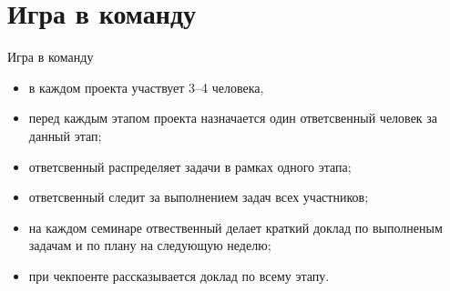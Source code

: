 \documentclass[10pt,pdf,hyperref={unicode}]{beamer}
\begin{document}
\section{Игра в команду}
\begin{frame}{Игра в команду}
\bigskip

\begin{itemize}
    \item в каждом проекта участвует 3--4 человека,
    \item перед каждым этапом проекта назначается один ответсвенный человек за данный этап;
    \item ответсвенный распределяет задачи в рамках одного этапа;
    \item ответсвенный следит за выполнением задач всех участников;
    \item на каждом семинаре отвественный делает краткий доклад по выполненым задачам и по плану на следующую неделю;
    \item при чекпоенте рассказывается доклад по всему этапу.
\end{itemize}
\end{frame}
\end{document}
